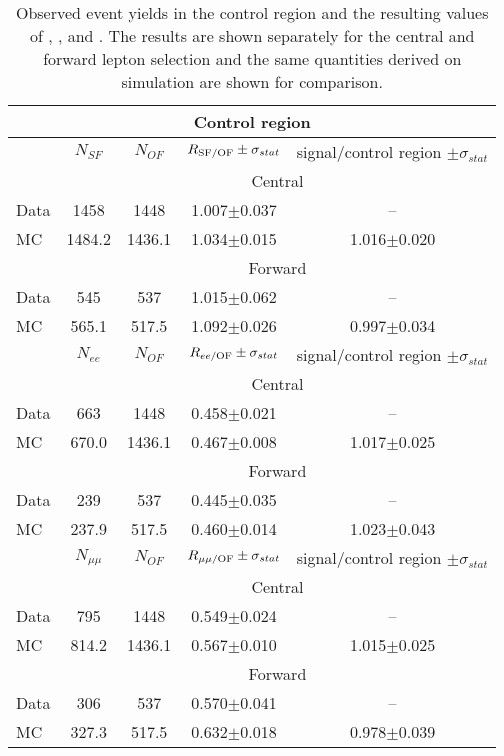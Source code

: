 
\begin{table}[hbtp]
 \renewcommand{\arraystretch}{1.3}
 \setlength{\belowcaptionskip}{6pt}
 \centering
 \caption{Observed event yields in the control region and the resulting values of \Rsfof, \Reeof, and \Rmmof. The results are shown separately for the central and forward lepton selection and the same quantities derived on simulation are shown for comparison.}
  \label{tab:rSFOF}
\begin{tabular}{l|c|c|c|c}
\multicolumn{5}{c}{Control region}\\ \hline     
 & $N_{SF}$ & $N_{OF}$ & $ R_{\text{SF/OF}} \pm \sigma_{stat}$ & signal/control region $\pm \sigma_{stat}$  \\    
\hline
&  \multicolumn{4}{c}{Central} \\
\hline
 Data & 1458 & 1448 & 1.007$\pm$0.037 & -- \\
 MC & 1484.2 & 1436.1 & 1.034$\pm$0.015 & 1.016$\pm$0.020\\
 
 
    \hline 
& \multicolumn{4}{c}{Forward} \\
\hline
 Data & 545 & 537 & 1.015$\pm$0.062 & -- \\
 MC & 565.1 & 517.5 & 1.092$\pm$0.026 & 0.997$\pm$0.034\\

\hline\hline
 & $N_{ee}$ & $N_{OF}$ & $ R_\text{$ee$/OF} \pm \sigma_{stat}$ & signal/control region $\pm \sigma_{stat}$  \\    
\hline
&  \multicolumn{4}{c}{Central} \\
\hline
 Data & 663 & 1448 & 0.458$\pm$0.021 & -- \\
 MC & 670.0 & 1436.1 & 0.467$\pm$0.008 & 1.017$\pm$0.025\\
 
 
    \hline 
& \multicolumn{4}{c}{Forward} \\
\hline
 Data & 239 & 537 & 0.445$\pm$0.035 & -- \\
 MC & 237.9 & 517.5 & 0.460$\pm$0.014 & 1.023$\pm$0.043\\

\hline\hline
 & $N_{\mu\mu}$ & $N_{OF}$ & $ R_\text{$\mu\mu$/OF} \pm \sigma_{stat}$ & signal/control region $\pm \sigma_{stat}$  \\    
\hline
& \multicolumn{4}{c}{Central} \\
\hline
 Data & 795 & 1448 & 0.549$\pm$0.024 & -- \\
 MC & 814.2 & 1436.1 & 0.567$\pm$0.010 & 1.015$\pm$0.025\\
 
 
    \hline 
 & \multicolumn{4}{c}{Forward} \\
\hline
 Data & 306 & 537 & 0.570$\pm$0.041 & -- \\
 MC & 327.3 & 517.5 & 0.632$\pm$0.018 & 0.978$\pm$0.039\\

  
\end{tabular}  
\end{table}
